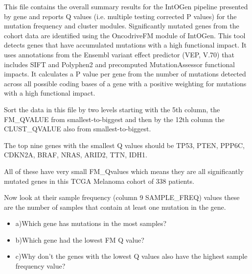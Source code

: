 \begin{information}
This file contains the overall summary results for the IntOGen pipeline presented by
gene and reports Q values (i.e. multiple testing corrected P values) for the mutation
frequency and cluster modules.
\vspace{4 mm]}
Significantly mutated genes from the cohort data are identified using the OncodriveFM
module of IntOGen. This tool detects genes that have accumulated mutations with a
high functional impact. It uses annotations from the Ensembl variant effect predictor
(VEP, V.70) that includes SIFT and Polyphen2 and precomputed MutationAssessor functional
impacts. It calculates a P value per gene from the number of mutations detected across
all possible coding bases of a gene with a positive weighting for mutations with a high
functional impact.
\end{information}

\begin{steps}
Sort the data in this file by two levels starting with the 5th column,
the FM\_QVALUE from smallest-to-biggest and then by the 12th column the
CLUST\_QVALUE also from smallest-to-biggest.
\end{steps}

The top nine genes with the smallest Q values should be
TP53, PTEN, PPP6C, CDKN2A, BRAF, NRAS, ARID2, TTN, IDH1.

\begin{information}
All of these have very small FM\_Qvalues which means they are all significantly
mutated genes in this TCGA Melanoma cohort of 338 patients.
\end{information}

\begin{steps}
Now look at their sample frequency (column 9 SAMPLE\_FREQ) values these are
the number of samples that contain at least one mutation in the gene.
\end{steps}

\begin{questions}
\begin{itemize}
\item a)Which gene has mutations in the most samples?
\item b)Which gene had the lowest FM Q value?
\item c)Why don't the genes with the lowest Q values also have the highest sample frequency
value?
\end{itemize}
\end{questions}

